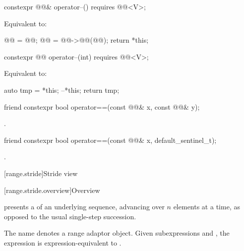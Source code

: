 \begin{itemdecl}
constexpr @@& operator--() requires @@<V>;
\end{itemdecl}

\begin{itemdescr}
\pnum
\effects
Equivalent to:
\begin{codeblock}
@@ = @@;
@@ = @@->@@(@@);
return *this;
\end{codeblock}
\end{itemdescr}

\begin{itemdecl}
constexpr @@ operator--(int) requires @@<V>;
\end{itemdecl}

\begin{itemdescr}
\pnum
\effects
Equivalent to:
\begin{codeblock}
auto tmp = *this;
--*this;
return tmp;
\end{codeblock}
\end{itemdescr}

\begin{itemdecl}
friend constexpr bool operator==(const @@& x, const @@& y);
\end{itemdecl}

\begin{itemdescr}
\pnum
\returns
{}.
\end{itemdescr}

\begin{itemdecl}
friend constexpr bool operator==(const @@& x, default_sentinel_t);
\end{itemdecl}

\begin{itemdescr}
\pnum
\returns
{}.
\end{itemdescr}

[range.stride]{Stride view}

[range.stride.overview]{Overview}

\pnum
{} presents a  of an underlying sequence,
advancing over $n$ elements at a time,
as opposed to the usual single-step succession.

\pnum
The name  denotes
a range adaptor object.
Given subexpressions  and ,
the expression 
is expression-equivalent to .

